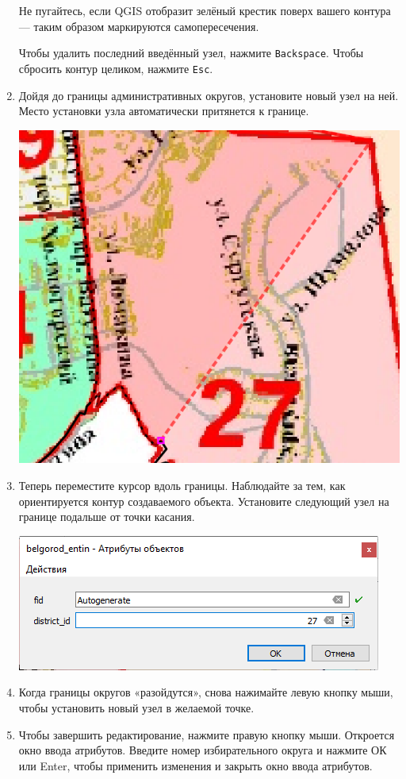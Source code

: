 \documentclass[
  12pt,
]{book}
\begin{document}
\begin{enumerate}
  Не пугайтесь, если QGIS отобразит зелёный крестик поверх вашего контура --- таким образом маркируются самопересечения.

  Чтобы удалить последний введённый узел, нажмите \texttt{Backspace}. Чтобы сбросить контур целиком, нажмите \texttt{Esc}.
\item
  Дойдя до границы административных округов, установите новый узел на ней. Место установки узла автоматически притянется к границе.

  \includegraphics{images/Ex05/Editing5.png}
\item
  Теперь переместите курсор вдоль границы. Наблюдайте за тем, как ориентируется контур создаваемого объекта. Установите следующий узел на границе подальше от точки касания.

  \includegraphics{images/Ex05/Editing6.png}
\item
  Когда границы округов «разойдутся», снова нажимайте левую кнопку мыши, чтобы установить новый узел в желаемой точке.
\item
  Чтобы завершить редактирование, нажмите правую кнопку мыши. Откроется окно ввода атрибутов. Введите номер избирательного округа и нажмите ОК или Enter, чтобы применить изменения и закрыть окно ввода атрибутов.


\end{enumerate}
\end{document}
